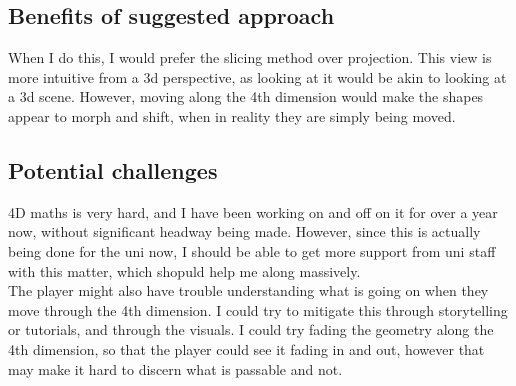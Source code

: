 \documentclass[12pt]{article}
\begin{document}
\subsection{Benefits of suggested approach}
When I do this, I would prefer the slicing method over projection. 
This view is more intuitive from a 3d perspective, as looking at it would be akin to looking at a 3d scene. 
However, moving along the 4th dimension would make the shapes appear to morph and shift, when in reality they are simply being moved.

\subsection{Potential challenges}
4D maths is very hard, and I have been working on and off on it for over a year now, without significant headway being made. 
However, since this is actually being done for the uni now, I should be able to get more support from uni staff with this matter, which shopuld help me along massively.\\
The player might also have trouble understanding what is going on when they move through the 4th dimension. I could try to mitigate this through storytelling or tutorials, and through the visuals.
I could try fading the geometry along the 4th dimension, so that the player could see it fading in and out, however that may make it hard to discern what is passable and not.
\end{document}
